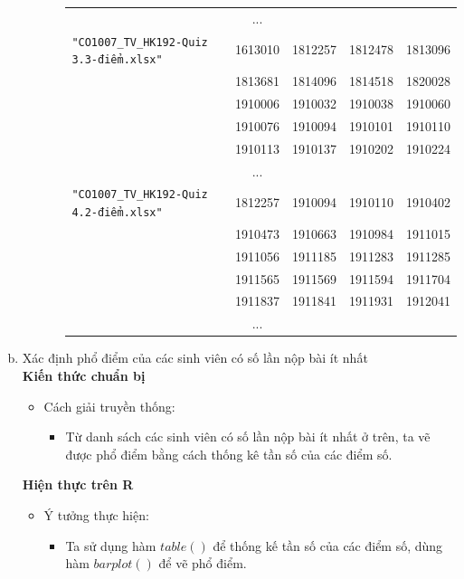 \documentclass[a4paper]{article}
\theoremstyle{definition}
\begin{document}
\begin{enumerate}[a)]
\begin{itemize}
\begin{itemize}
\begin{center}
\begin{tabular}{l c c c c}
                     & ...\\
                     \texttt{"CO1007\_TV\_HK192-Quiz 3.3-điểm.xlsx"} & 1613010 & 1812257 & 1812478 & 1813096 \\ & 1813681 & 1814096 & 1814518 & 1820028 \\ & 1910006 & 1910032 & 1910038 & 1910060 \\ & 1910076 & 1910094 & 1910101 & 1910110 \\ & 1910113 & 1910137 & 1910202 & 1910224\\
                     & ...\\
                     \texttt{"CO1007\_TV\_HK192-Quiz 4.2-điểm.xlsx"} & 1812257 & 1910094 & 1910110 & 1910402 \\ & 1910473 & 1910663 & 1910984 & 1911015 \\ & 1911056 & 1911185 & 1911283 & 1911285 \\ & 1911565 & 1911569 & 1911594 & 1911704 \\ & 1911837 & 1911841 & 1911931 & 1912041\\
                     & ...
                \end{tabular}
            \end{center}
        \end{itemize}
    \end{itemize}
    \bf\item {Xác định phổ điểm của các sinh viên có số lần nộp bài ít nhất}\\[6pt]
    \bf Kiến thức chuẩn bị\normalfont
    \begin{itemize}
        \item Cách giải truyền thống:
        \begin{itemize}
            \item Từ danh sách các sinh viên có số lần nộp bài ít nhất ở trên, ta vẽ được phổ điểm bằng cách thống kê tần số của các điểm số.
        \end{itemize}
    \end{itemize}
    \bf Hiện thực trên R\normalfont
    \begin{itemize}
        \item Ý tưởng thực hiện:
        \begin{itemize}
            \item Ta sử dụng hàm $table()$ để thống kế tần số của các điểm số, dùng hàm $barplot()$ để vẽ phổ điểm.
            \begin{center}
                \begin{tabular}{p{13cm}}

\end{tabular}
\end{center}
\end{itemize}
\end{itemize}
\end{enumerate}
\end{document}
